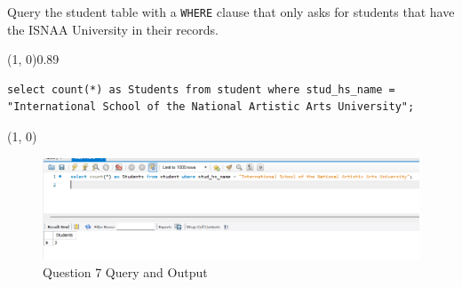 
Query the student table with a \texttt{WHERE} clause that only asks for students that have the ISNAA University in their records. 
\vspace{\baselineskip}

\sol{}
\noindent\line(1, 0){0.89\linewidth}
\begin{verbatim}
select count(*) as Students from student where stud_hs_name =
"International School of the National Artistic Arts University";
\end{verbatim}
\noindent\line(1, 0){\linewidth}

\begin{figure}[H]
    \centering
    \includegraphics[width=0.7\linewidth]{images/q7.png}
    \caption{Question 7 Query and Output}
\end{figure}
